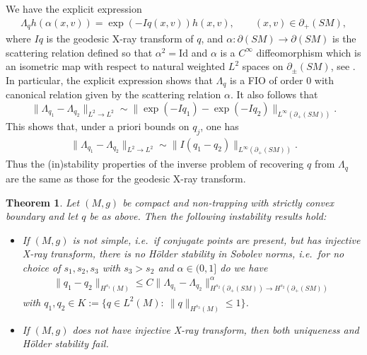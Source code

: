 \documentclass[12pt,twoside]{amsart}
\numberwithin{equation}{section}
\renewcommand{\leq}{\leqslant}
\newtheorem{theorem}{Theorem}[section]
\begin{document}
We have the explicit expression 
\begin{align}
\label{eq:sol}
\Lambda_q h(\alpha(x,v)) = \exp(-Iq(x,v)) h(x,v), \qquad (x,v) \in \partial_+(SM),
\end{align}
where $Iq$ is the geodesic X-ray transform of $q$, and $\alpha: \partial(SM) \to \partial(SM)$ is the scattering relation defined so that $\alpha^2 = \mathrm{Id}$ and $\alpha$ is a $C^{\infty}$ diffeomorphism which is an isometric map with respect to natural weighted $L^2$ spaces on $\partial_{\pm}(SM)$, see \cite{PestovUhlmann}. In particular, the explicit expression shows that $\Lambda_q$ is a FIO of order $0$ with canonical relation given by the scattering relation $\alpha$. It also follows that 
\[
\| \Lambda_{q_1} - \Lambda_{q_2} \|_{L^2 \to L^2} \sim \| \exp(-Iq_1) - \exp(-Iq_2) \|_{L^{\infty}(\partial_+(SM))}.
\]
This shows that, under a priori bounds on $q_j$, one has 
\begin{align}
\label{eq:rep_transport}
\| \Lambda_{q_1} - \Lambda_{q_2} \|_{L^2 \to L^2} \sim \| I(q_1 - q_2) \|_{L^{\infty}(\partial_+(SM))}.
\end{align}
Thus the (in)stability properties of the inverse problem of recovering $q$ from $\Lambda_q$ are the same as those for the geodesic X-ray transform. 

\begin{theorem}
\label{thm:transport}
Let $(M,g)$ be compact and non-trapping with strictly convex boundary and let $q$ be as above. Then the following instability results hold:
\begin{itemize}
\item 
If $(M,g)$ is not simple, i.e.\ if conjugate points are present, but has injective X-ray transform, there is no H\"older stability in Sobolev norms, i.e.\ for no choice of $s_1, s_2, s_3$ with $s_3>s_2$ and $\alpha\in (0,1]$ do we have
\begin{align*}
\|q_1-q_2\|_{H^{s_1}(M)} \leq C\|\Lambda_{q_1}-\Lambda_{q_2}\|_{H^{s_2}(\partial_+(SM)) \rightarrow H^{s_2}(\partial_+(SM))}^{\alpha}
\end{align*}
with $q_1, q_2 \in K:=\{q\in L^2(M): \ \|q\|_{H^{s_3}(M)} \leq 1 \}$.
\item If $(M,g)$ does not have injective X-ray transform, then both uniqueness and H\"older stability fail.
\end{itemize}
\end{theorem}
\end{document}
